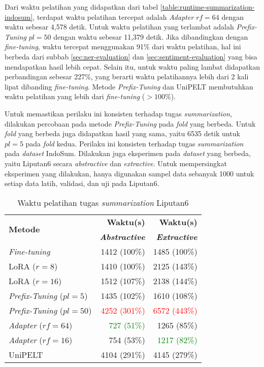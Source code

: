 Dari waktu pelatihan yang didapatkan dari tabel \ref{table:runtime-summarization-indosum}, terdapat waktu pelatihan tercepat adalah \textit{Adapter} $rf=64$ dengan waktu sebesar 4,578 detik. Untuk waktu pelatihan yang terlambat adalah \textit{Prefix-Tuning} $pl=50$ dengan waktu sebesar 11,379 detik. Jika dibandingkan dengan \textit{fine-tuning}, waktu tercepat menggunakan 91\% dari waktu pelatihan, hal ini berbeda dari subbab \ref{sec:ner-evaluation} dan \ref{sec:sentiment-evaluation} yang bisa mendapatkan hasil lebih cepat. Selain itu, untuk waktu paling lambat didapatkan perbandingan sebesar 227\%, yang berarti waktu pelatihannya lebih dari 2 kali lipat dibanding \textit{fine-tuning}. Metode \textit{Prefix-Tuning} dan UniPELT membutuhkan waktu pelatihan yang lebih dari \textit{fine-tuning} ($>100\%$). 

Untuk memastikan perilaku ini konsisten terhadap tugas \textit{summarization}, dilakukan percobaan pada metode \textit{Prefix-Tuning} pada \textit{fold} yang berbeda. Untuk \textit{fold} yang berbeda juga didapatkan hasil yang sama, yaitu 6535 detik untuk $pl=5$ pada \textit{fold} kedua. Perilaku ini konsisten terhadap tugas \textit{summarization} pada \textit{dataset} IndoSum. Dilakukan juga eksperimen pada \textit{dataset} yang berbeda, yaitu Liputan6 secara \textit{abstractive} dan \textit{extractive}. Untuk mempersingkat eksperimen yang dilakukan, hanya digunakan sampel data sebanyak 1000 untuk setiap data latih, validasi, dan uji pada Liputan6.

\begin{table}[h]
    \centering
    \caption{Waktu pelatihan tugas \textit{summarization} Liputan6}
    \label{table:runtime-summarization-liputan6}
    \begin{tabular}{l|r|r}
        \toprule
        \multirow{2}{*}{\textbf{Metode}} & \textbf{Waktu(s)}  & \textbf{Waktu(s)}  \\
                                         & \textbf{\textit{Abstractive}} & \textbf{\textit{Extractive}} \\
        \midrule
        \textit{Fine-tuning} & 1412 (100\%) & 1485 (100\%) \\
        LoRA ($r=8$) & 1410 (100\%) & 2125 (143\%) \\
        LoRA ($r=16$) & 1512 (107\%) & 2138 (144\%) \\
        \textit{Prefix-Tuning} ($pl=5$) & 1435 (102\%) & 1610 (108\%) \\
        \textit{Prefix-Tuning} ($pl=50$) & \textcolor{Red}{4252 (301\%)} & \textcolor{Red}{6572 (443\%)} \\
        \textit{Adapter} ($rf=64$) & \textcolor{Green}{727 (51\%)} & 1265 (85\%) \\
        \textit{Adapter} ($rf=16$) & 754 (53\%) & \textcolor{Green}{1217 (82\%)} \\
        UniPELT & 4104 (291\%) & 4145 (279\%) \\
        \bottomrule
    \end{tabular}
\end{table}

